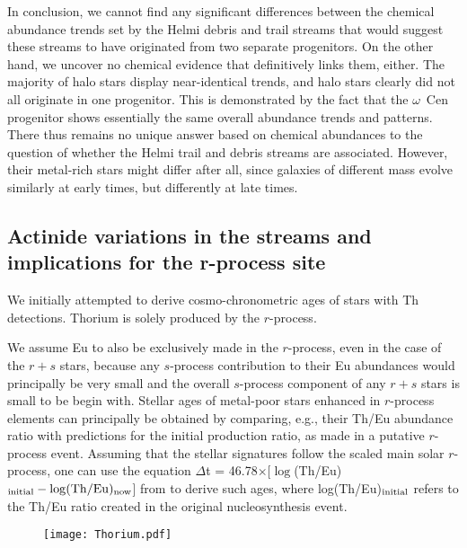 \documentclass[twocolumn]{aastex63}
\begin{document}
In conclusion, we cannot find any significant differences between the chemical abundance trends set by the Helmi debris and trail streams that would suggest these streams to have originated from two separate progenitors. On the other hand, we uncover no chemical evidence that definitively links them, either.  The majority of halo stars display near-identical trends, and halo stars clearly did not all originate in one progenitor. This is demonstrated by the fact that the $\omega$~Cen progenitor shows essentially the same overall abundance trends and patterns. There thus remains no unique answer based on chemical abundances to the question of whether the Helmi trail and debris streams are associated. However, their metal-rich stars might differ after all, since galaxies of different mass evolve similarly at early times, but differently at late times.



\subsection{Actinide variations in the streams and implications for the r-process site} \label{cosmo}

We initially attempted to derive cosmo-chronometric ages of stars with Th detections.
Thorium is solely produced by the $r$-process.

We assume Eu to also be exclusively made in the $r$-process, even in the case of the $r+s$ stars, because any $s$-process contribution to their Eu abundances would principally be very small and the overall $s$-process component of any $r+s$ stars is small to be begin with. Stellar ages of metal-poor stars enhanced in $r$-process elements can principally be obtained by comparing, e.g., their Th/Eu abundance ratio with predictions for the initial production ratio, as made in a putative $r$-process event. Assuming that the stellar signatures follow the scaled main solar $r$-process, one can use the equation 
$\Delta$t = 46.78$\times$[$\log$(Th/Eu)$_{\rm initial}-\log(\rm{Th/Eu})_{\rm now}$] from \citet{Cayrel01} to derive such ages, where log(Th/Eu)$_{\rm initial}$ refers to the Th/Eu ratio created in the original nucleosynthesis event.

\begin{figure*}[ht!]
 \begin{center}
  \texttt{[image: Thorium.pdf]} 
 \end{center}
\end{figure*}
\end{document}
